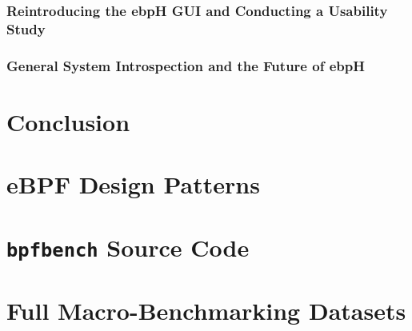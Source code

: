 \documentclass[
  12pt]{findlay}
\begin{document}
\hypertarget{reintroducing-the-ebph-gui-and-conducting-a-usability-study}{%
\subsubsection{Reintroducing the ebpH GUI and Conducting a Usability
Study}\label{reintroducing-the-ebph-gui-and-conducting-a-usability-study}}

\label{gui_section}

\hypertarget{general-system-introspection-and-the-future-of-ebph}{%
\subsubsection{General System Introspection and the Future of
ebpH}\label{general-system-introspection-and-the-future-of-ebph}}

\label{general_introspection}

\hypertarget{conclusion}{%
\section{Conclusion}\label{conclusion}}

\clearpage
{}
\printbibliography
\clearpage

\appendix
\appendixpage

\hypertarget{ebpf-design-patterns}{%
\section{eBPF Design Patterns}\label{ebpf-design-patterns}}

\label{ebpf-design-patterns}


\FloatBarrier

\clearpage

\hypertarget{bpfbench-source-code}{%
\section{\texorpdfstring{\texttt{bpfbench} Source
Code}{bpfbench Source Code}}\label{bpfbench-source-code}}

\label{bpfbench}


\hypertarget{full-macro-benchmarking-datasets}{%
\section{Full Macro-Benchmarking
Datasets}\label{full-macro-benchmarking-datasets}}

\label{appendix_datasets}
\end{document}
